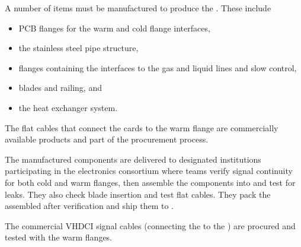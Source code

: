 A number of items must be manufactured to produce the . These include 
\begin{itemize}
\item PCB flanges for the warm and cold \fdth flange interfaces, 
\item the stainless steel pipe structure, 
\item flanges containing the interfaces to the gas and liquid lines and slow control, 
\item blades and railing, and 
\item the heat exchanger system. 
\end{itemize}
The flat cables that connect the  cards to the warm flange are commercially available products and part of the  procurement process. 

The manufactured components are delivered to designated institutions participating in the  electronics consortium where teams verify signal continuity for both cold and warm flanges, then assemble the components into  and test for leaks. They also check blade insertion and test flat cables. They pack the assembled  after verification and ship them to . 

The commercial VHDCI signal cables (connecting the  to the ) are procured and tested with the  warm flanges.


